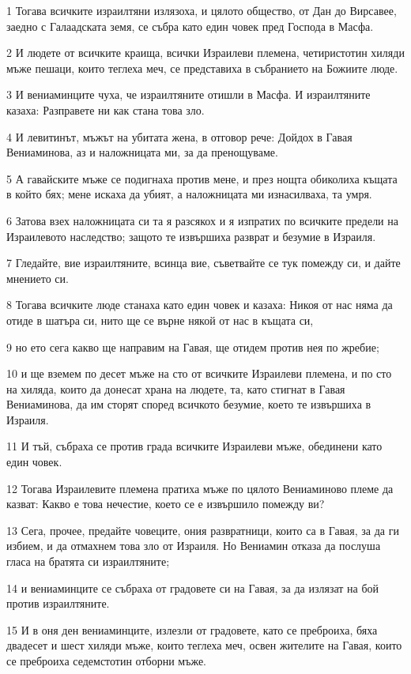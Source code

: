 \par 1 Тогава всичките израилтяни излязоха, и цялото общество, от Дан до Вирсавее, заедно с Галаадската земя, се събра като един човек пред Господа в Масфа.
\par 2 И людете от всичките краища, всички Израилеви племена, четиристотин хиляди мъже пешаци, които теглеха меч, се представиха в събранието на Божиите люде.
\par 3 И вениаминците чуха, че израилтяните отишли в Масфа. И израилтяните казаха: Разправете ни как стана това зло.
\par 4 И левитинът, мъжът на убитата жена, в отговор рече: Дойдох в Гавая Вениаминова, аз и наложницата ми, за да пренощуваме.
\par 5 А гавайските мъже се подигнаха против мене, и през нощта обиколиха къщата в който бях; мене искаха да убият, а наложницата ми изнасилваха, та умря.
\par 6 Затова взех наложницата си та я разсякох и я изпратих по всичките предели на Израилевото наследство; защото те извършиха разврат и безумие в Израиля.
\par 7 Гледайте, вие израилтяните, всинца вие, съветвайте се тук помежду си, и дайте мнението си.
\par 8 Тогава всичките люде станаха като един човек и казаха: Никоя от нас няма да отиде в шатъра си, нито ще се върне някой от нас в къщата си,
\par 9 но ето сега какво ще направим на Гавая, ще отидем против нея по жребие;
\par 10 и ще вземем по десет мъже на сто от всичките Израилеви племена, и по сто на хиляда, които да донесат храна на людете, та, като стигнат в Гавая Вениаминова, да им сторят според всичкото безумие, което те извършиха в Израиля.
\par 11 И тъй, събраха се против града всичките Израилеви мъже, обединени като един човек.
\par 12 Тогава Израилевите племена пратиха мъже по цялото Вениаминово племе да казват: Какво е това нечестие, което се е извършило помежду ви?
\par 13 Сега, прочее, предайте човеците, ония развратници, които са в Гавая, за да ги избием, и да отмахнем това зло от Израиля. Но Вениамин отказа да послуша гласа на братята си израилтяните;
\par 14 и вениаминците се събраха от градовете си на Гавая, за да излязат на бой против израилтяните.
\par 15 И в оня ден вениаминците, излезли от градовете, като се преброиха, бяха двадесет и шест хиляди мъже, които теглеха меч, освен жителите на Гавая, които се преброиха седемстотин отборни мъже.
